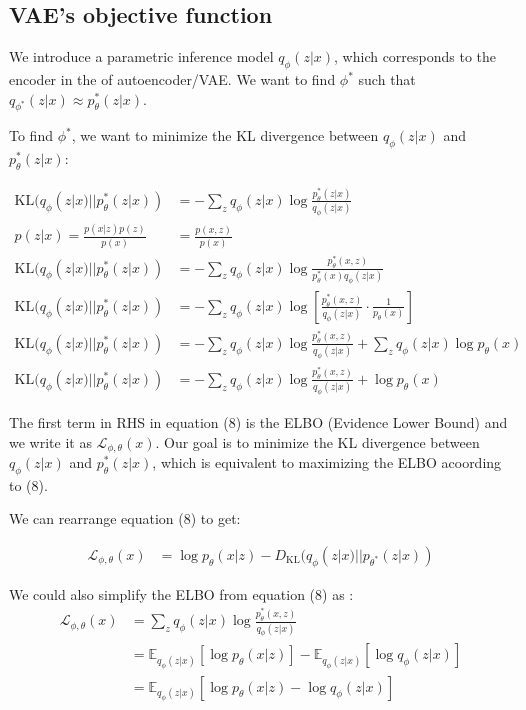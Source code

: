 \documentclass[11pt]{article}
\theoremstyle{definition}
\begin{document}
\subsection{VAE's objective function}

We introduce a parametric inference model $q_\phi(z|x)$, which corresponds to the encoder in the of autoencoder/VAE. We want to find $\phi^*$ such that $q_{\phi^*}(z|x) \approx p_\theta^*(z|x)$.

To find $\phi^*$, we want to minimize the KL divergence between $q_\phi(z|x)$ and $p_\theta^*(z|x)$:

\begin{align}
    \text{KL}(q_\phi(z|x)||p_\theta^*(z|x)) &= -\sum_{z} q_\phi(z|x) \log \frac{p_\theta^*(z|x)}{q_\phi(z|x)} \\
    p(z|x) = \frac{p(x|z) p(z)}{p(x)} &= \frac{p(x, z)}{p(x)}\\
    \text{KL}(q_\phi(z|x)||p_\theta^*(z|x)) &= -\sum_{z} q_\phi(z|x) \log \frac{p_\theta^*(x, z)}{p_\theta^*(x)q_\phi(z|x)} \\
    \text{KL}(q_\phi(z|x)||p_\theta^*(z|x)) &= -\sum_{z} q_\phi(z|x) \log \left[ \frac{p_\theta^*(x, z)}{q_\phi(z|x)}\cdot\frac{1}{p_\theta(x)}\right] \\
    \text{KL}(q_\phi(z|x)||p_\theta^*(z|x)) &= -\sum_{z} q_\phi(z|x) \log \frac{p_\theta^*(x, z)}{q_\phi(z|x)} + \sum_{z} q_\phi(z|x) \log p_\theta(x) \\
    \text{KL}(q_\phi(z|x)||p_\theta^*(z|x)) &= -\sum_{z} q_\phi(z|x) \log \frac{p_\theta^*(x, z)}{q_\phi(z|x)} + \log p_\theta(x)
\end{align}

The first term in RHS in equation (8) is the ELBO (Evidence Lower Bound) and we write it as $\mathcal{L}_{\phi, \theta}(x)$. Our goal is to minimize the KL divergence between $q_\phi(z|x)$ and $p_\theta^*(z|x)$, which is equivalent to maximizing the ELBO acoording to (8).

We can rearrange equation (8) to get:

\begin{align}
    \mathcal{L}_{\phi, \theta}(x) &= \log p_\theta(x|z) - D_\text{KL}(q_\phi(z|x)||p_{\theta^*}(z|x))
\end{align}


We could also simplify the ELBO from equation (8) as :
\begin{align}
    \mathcal{L}_{\phi, \theta}(x) &=\sum_{z} q_\phi(z|x) \log \frac{p_\theta^*(x, z)}{q_\phi(z|x)}\\
    &= \mathbb{E}_{q_\phi(z|x)}[\log p_\theta(x|z)] - \mathbb{E}_{q_\phi(z|x)}[\log q_\phi(z|x)]\\
    &= \mathbb{E}_{q_\phi(z|x)}[\log p_\theta(x|z) - \log q_\phi(z|x)]
\end{align}
\end{document}
